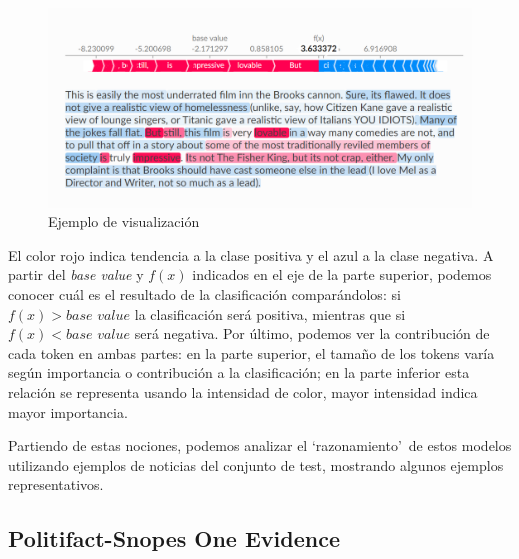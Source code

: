 \begin{figure}[!h]
    \centering
    \includegraphics[width=0.8\ancho]{figs/shap_example.png}
    \caption{Ejemplo de visualización \citep{SHAPtextplot}}
    \label{fig:shap-ex}
\end{figure}

El color rojo indica tendencia a la clase positiva y el azul a la clase negativa. A partir del \textit{base value} y $f(x)$ indicados en el eje de la parte superior, podemos conocer cuál es el resultado de la clasificación comparándolos: si $f(x) > \textit{base value}$ la clasificación será positiva, mientras que si $f(x) < \textit{base value}$ será negativa. Por último, podemos ver la contribución de cada token en ambas partes: en la parte superior, el tamaño de los tokens varía según importancia o contribución a la clasificación; en la parte inferior esta relación se representa usando la intensidad de color, mayor intensidad indica mayor importancia.

Partiendo de estas nociones, podemos analizar el `razonamiento'\ de estos modelos utilizando ejemplos de noticias del conjunto de test, mostrando algunos ejemplos representativos.

\subsection{Politifact-Snopes One Evidence}

